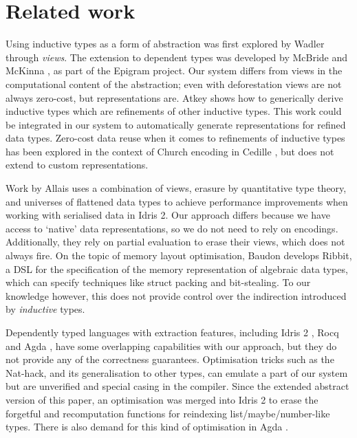 \section{Related work}

Using inductive types as a form of abstraction was first explored by Wadler
\cite{Wadler1987-zp} through \emph{views}. The extension to dependent types
was developed by McBride and McKinna \cite{Mcbride2004-fd}, as part of the
Epigram project. Our system differs from views in the computational content
of the abstraction; even with deforestation \cite{Wadler1990-yo} views are not
always zero-cost, but representations are.
Atkey \cite{Atkey2011-ex} shows how to generically derive inductive types which
are refinements of other inductive types. This work could be integrated in our
system to automatically generate representations for refined data types.
Zero-cost data reuse when it comes to refinements of inductive types has been
explored in the context of Church encoding in Cedille \cite{Diehl2018-ba}, but
does not extend to custom representations.

Work by Allais \cite{Allais2023-pf,Allais2023-zq} uses a combination of views,
erasure by quantitative type theory, and universes of flattened data types to
achieve performance improvements when working with serialised data in Idris 2.
Our approach differs because we have access to `native' data representations, so
we do not need to rely on encodings. Additionally, they rely on partial evaluation
to erase their views, which does not always fire. On the topic of memory layout
optimisation, Baudon \cite{Baudon2023-cy} develops Ribbit, a DSL for the
specification of the memory representation of algebraic data types, which can
specify techniques like struct packing and bit-stealing. To our knowledge
however, this does not provide control over the indirection introduced by
\emph{inductive} types.

Dependently typed languages with extraction features, including Idris 2 \cite{idris-extraction}, Rocq
\cite{coq-extraction} and Agda \cite{agda-extraction}, have some overlapping
capabilities with our approach, but they do not provide any of the correctness
guarantees. Optimisation tricks such as the Nat-hack, and its generalisation to
other types, can emulate a part of our system but are unverified and special
casing in the compiler. Since the extended abstract version of this paper, an
optimisation was merged into Idris 2 \cite{idris-pr} to erase the forgetful and
recomputation functions for reindexing list/maybe/number-like types.
There is also demand for this kind of optimisation in Agda
\cite{agda-issue}.

